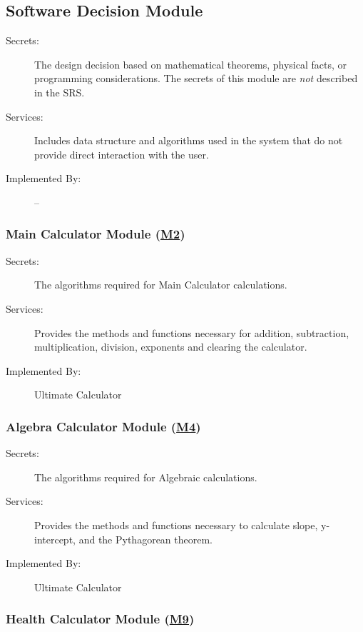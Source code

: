 \documentclass[12pt, titlepage]{article}
\begin{document}
\subsection{Software Decision Module}

\begin{description}
\item[Secrets:] The design decision based on mathematical theorems, physical
  facts, or programming considerations. The secrets of this module are
  \emph{not} described in the SRS.
\item[Services:] Includes data structure and algorithms used in the system that
  do not provide direct interaction with the user. 
\item[Implemented By:] --
\end{description}

\subsubsection{Main Calculator Module (\hyperref[m2]{M2})}

\begin{description}
\item[Secrets:]The algorithms required for Main Calculator calculations.
\item[Services:] Provides the methods and functions necessary for addition, subtraction, multiplication, division, exponents and clearing the calculator.
\item[Implemented By:] Ultimate Calculator
\end{description}

\subsubsection{Algebra Calculator Module (\hyperref[m4]{M4})}

\begin{description}
\item[Secrets:]The algorithms required for Algebraic calculations.
\item[Services:] Provides the methods and functions necessary to calculate slope, y-intercept, and the Pythagorean theorem.
\item[Implemented By:] Ultimate Calculator
\end{description}

\subsubsection{Health Calculator Module (\hyperref[m9]{M9})}
\end{document}
